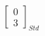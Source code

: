 \documentclass[preview]{standalone}
\begin{document}
\begin{align*}
\begin{bmatrix} 0 \\ 3 \end{bmatrix}_{Std}
\end{align*}
\end{document}
